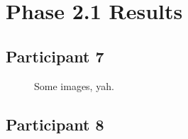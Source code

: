 \lipsum[1]


\clearpage

\section{Phase 2.1 Results}

\lipsum[1]

\lipsum[2]

\lipsum[3]


\clearpage

\subsection{Participant 7}

\begin{figure}[h]
	\caption{Some images, yah.}
\end{figure}

\lipsum[1]


\clearpage

\subsection{Participant 8}

